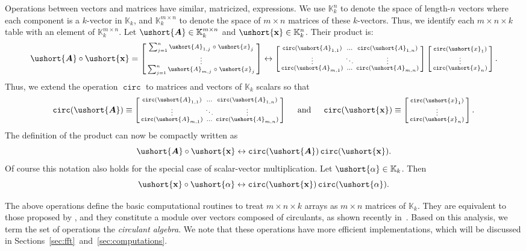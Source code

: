 \documentclass[1p,authoryear,letterpaper]{elsarticle}
\DeclareMathOperator{\tcirc}{\texttt{circ}}
\providecommand{\eqdef}{\equiv}
\providecommand{\KK}{\mathbb{K}}
\providecommand{\sbmat}[1]{\left[\begin{smallmatrix} #1 \end{smallmatrix}\right]}
\providecommand{\mat}{\boldsymbol}
\renewcommand{\vec}{\mathbf}
\renewcommand{\circeq}{\leftrightarrow}
\newcommand{\cel}[1]{\ushort{#1}}
\newcommand{\celm}[1]{\cel{\mat{#1}}}
\newcommand{\celv}[1]{\cel{\vec{#1}}}
\newcommand{\calpha}{\ensuremath{\cel{\alpha}}}
\newcommand{\cvx}{\ensuremath{\celv{x}}}
\providecommand{\cmA}{\ensuremath{\celm{A}}}
\begin{document}
Operations between vectors and matrices have similar, matricized, expressions. 
We use $\KK_k^{n}$ to denote the space of length-$n$ vectors where each
component is a $k$-vector in $\KK_k$, and  $\KK_k^{m \times n}$ to denote the space of $m \times n$ 
matrices of these $k$-vectors.  Thus, we identify each $m \times n \times k$ table 
with an element of $\KK_k^{m \times n}$.  Let $\cmA \in \KK_k^{m \times n}$ and $\cvx \in \KK_k^{n}$.  Their product is:
\begin{equation}
 \cmA \circ \cvx =
  \sbmat{ \sum_{j=1}^n \cel{A}_{1,j} \;\circ\; \cel{x}_j \\
                \vdots \\
                \sum_{j=1}^n \cel{A}_{m,j} \;\circ\; \cel{x}_j }
  \circeq
  \sbmat{ \tcirc( \cel{A}_{1,1} ) & \ldots & \tcirc( \cel{A}_{1,n} ) \\
                 \vdots & \ddots & \vdots \\
                 \tcirc( \cel{A}_{m,1} ) & \ldots & \tcirc( \cel{A}_{m,n} ) }
  \sbmat{ \tcirc( \cel{x}_{1} ) \\
                \vdots \\
                \tcirc( \cel{x}_{n} ) } .
\end{equation}
Thus, we extend the operation $\tcirc$ to matrices and vectors of $\KK_k$ scalars so that
\begin{equation}
 \tcirc(\cmA) \eqdef
\sbmat{ \tcirc( \cel{A}_{1,1} ) & \ldots & \tcirc( \cel{A}_{1,n} ) \\
                 \vdots & \ddots & \vdots \\
                 \tcirc( \cel{A}_{m,1} ) & \ldots & \tcirc( \cel{A}_{m,n} ) }
\quad \text{ and } \quad
\tcirc(\cvx) \eqdef
  \sbmat{ \tcirc( \cel{x}_{1} ) \\
                \vdots \\
                \tcirc( \cel{x}_{n} ) }.
\end{equation}
The definition of the product can now be compactly written as
\begin{equation} \label{eq:circ-op-end}
 \cmA \circ \cvx \circeq \tcirc(\cmA) \tcirc(\cvx).
\end{equation}
Of course this notation also holds for the special case of scalar-vector multiplication.  Let $\calpha \in \KK_k$.  Then
\[ \cvx \circ \calpha \circeq \tcirc(\cvx) \tcirc(\calpha). \]


The above operations define the basic computational routines to treat 
$m \times n \times k$  arrays as $m \times n$ matrices of $\KK_k$.  
They are equivalent to those proposed by \citet{kilmer2008-circ-tensor-svd}, 
and they constitute a module over vectors composed of circulants, as 
shown recently in~\citet{braman201x-tensor-eigenvalues}.  Based on this 
analysis, we term the set of operations the \emph{circulant algebra}.  
We note that these operations have more efficient implementations,
which will be discussed in Sections~\ref{sec:fft}~and~\ref{sec:computations}.
\end{document}
